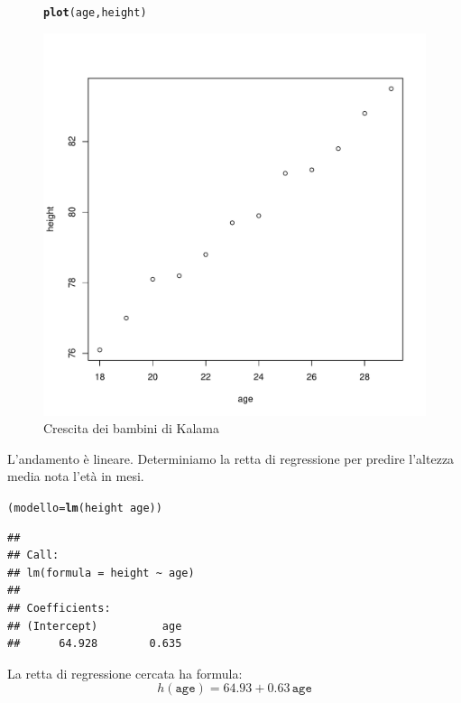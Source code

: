 \documentclass[onecolumn,12pt]{book}\usepackage[]{graphicx}\usepackage[]{color}
\makeatletter
\def\maxwidth{ %
  \ifdim\Gin@nat@width>\linewidth
    \linewidth
  \else
    \Gin@nat@width
  \fi
}
\newcommand{\hlopt}[1]{\textcolor[rgb]{0,0,0}{#1}}%
\newcommand{\hlstd}[1]{\textcolor[rgb]{0.345,0.345,0.345}{#1}}%
\newcommand{\hlkwb}[1]{\textcolor[rgb]{0.69,0.353,0.396}{#1}}%
\newcommand{\hlkwd}[1]{\textcolor[rgb]{0.737,0.353,0.396}{\textbf{#1}}}%
\newenvironment{kframe}{%
 \def\at@end@of@kframe{}%
 \ifinner\ifhmode%
  \def\at@end@of@kframe{\end{minipage}}%
  \begin{minipage}{\columnwidth}%
 \fi\fi%
 \def\FrameCommand##1{\hskip\@totalleftmargin \hskip-\fboxsep
 \colorbox{shadecolor}{##1}\hskip-\fboxsep
     \hskip-\linewidth \hskip-\@totalleftmargin \hskip\columnwidth}%
 \MakeFramed {\advance\hsize-\width
   \@totalleftmargin\z@ \linewidth\hsize
   \@setminipage}}%
 {\par\unskip\endMakeFramed%
 \at@end@of@kframe}
\newenvironment{knitrout}{}{} %
\makeatother
\begin{document}
\begin{figure}[htbp]
\begin{center}
\begin{knitrout}
\color{fgcolor}\begin{kframe}
\begin{alltt}
\hlkwd{plot}\hlstd{(age,height)}
\end{alltt}
\end{kframe}
\includegraphics[width=\maxwidth]{figure/unnamed-chunk-121-1} 

\end{knitrout}
\caption{Crescita dei bambini di Kalama}
\label{kalama}
\end{center}
\end{figure}
L'andamento \`e lineare. Determiniamo la retta di regressione
per predire l'altezza media nota l'et\`a in mesi.
\begin{knitrout}
\color{fgcolor}\begin{kframe}
\begin{alltt}
\hlstd{(modello}\hlkwb{=}\hlkwd{lm}\hlstd{(height}\hlopt{~}\hlstd{age))}
\end{alltt}
\begin{verbatim}
## 
## Call:
## lm(formula = height ~ age)
## 
## Coefficients:
## (Intercept)          age  
##      64.928        0.635
\end{verbatim}
\end{kframe}
\end{knitrout}
La retta di regressione cercata ha formula:
$$h(\texttt{age})=64.93+ 0.63\, \texttt{age}$$
\end{document}
